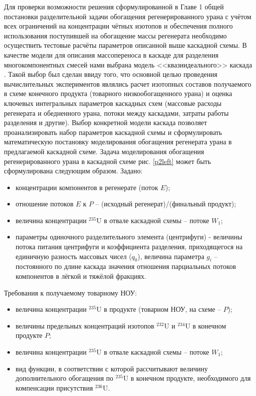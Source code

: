 Для проверки возможности решения сформулированной в Главе 1 общей постановки разделительной задачи обогащения регенерированного урана с учётом всех ограничений на концентрации чётных изотопов и обеспечения полного использования поступившей на обогащение массы регенерата необходимо осуществить тестовые расчёты параметров описанной выше каскадной схемы. 
В качестве модели для описания массопереноса в каскаде для разделения многокомпонентных смесей нами выбрана модель <<квазиидеального>> каскада \cite{sazykinKvaziidealnyeKaskadyDlya2000}. Такой выбор был сделан ввиду того, что основной целью проведения вычислительных экспериментов являлись расчет изотопных составов получаемого в схеме конечного продукта (товарного низкообогащенного урана) и оценка ключевых интегральных параметров каскадных схем (массовые расходы регенерата и обедненного урана, потоки между каскадами, затраты работы разделения и другие). Выбор конкретной модели каскада позволяет проанализировать набор параметров каскадной схемы и сформулировать математическую постановку моделирования обогащения регенерата урана в предлагаемой каскадной схеме.
Задача моделирования обогащения регенерированного урана в каскадной схеме рис. \ref{p2left} может быть сформулирована следующим образом.
Задано:

\begin{itemize}
    \item концентрации компонентов в регенерате (поток $E$); 
    \item отношение потоков $E$ к $P$ -- (исходный регенерат)/(финальный продукт);
    \item величина концентрации $^{235}$U в отвале каскадной схемы – потоке $W_{1}$;
    \item параметры одиночного разделительного элемента (центрифуги) - величины потока питания центрифуги и коэффициента разделения, приходящегося на единичную разность массовых чисел ($q_{0}$), величина параметра $g_{i}$ -- постоянного по длине каскада значения отношения парциальных потоков компонентов в лёгкой и тяжёлой фракциях.
\end{itemize}

Требования к получаемому товарному НОУ:

\begin{itemize}
    \item величина концентрации $^{235}$U в продукте (товарном НОУ, на схеме -- $P$);
    \item величины предельных концентраций изотопов $^{232}$U и $^{234}$U в конечном продукте $P$;
    \item величина концентрации $^{235}$U в отвале каскадной схемы -- потоке $W_{1}$;
    \item вид функции, в соответствии с которой рассчитывают величину дополнительного обогащения по $^{235}$U в конечном продукте, необходимого для компенсации присутствия $^{236}$U.
\end{itemize}

